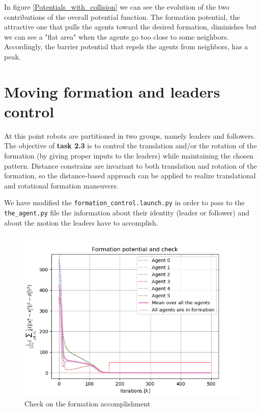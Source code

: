\documentclass[a4paper,11pt,oneside]{book}
\begin{document}
In figure \ref{Potentials_with_collision} we can see the evolution of the two contributions of the overall potential function. The formation potential, the attractive one that pulls the agents toward the desired formation, diminishes but we can see a "flat area" when the agents go too close to some neighbors. Accordingly, the barrier potential that repels the agents from neighbors, has a peak.

\section{Moving formation and leaders control}
At this point robots are partitioned in two groups, namely leaders and followers. The objective of \textbf{task 2.3} is to control the translation and/or the rotation of the formation (by giving proper inputs to the leaders) while maintaining the chosen pattern.
Distance constrains  are invariant to both translation and rotation of the formation, so the distance-based approach can be applied to realize translational and rotational formation maneuvers. 

We have modified the \texttt{formation\_control.launch.py} in order to pass to the \texttt{the\_agent.py} file the information about their identity (leader or follower) and about the motion the leaders have to accomplish.

\begin{figure}[h]
\centering
	\includegraphics[scale=0.6]{Task-2.3_Formation-p_Linear-trj_Hexagon}
	\caption{Check on the formation accomplishment}
	\label{Check}
\end{figure}
\end{document}
